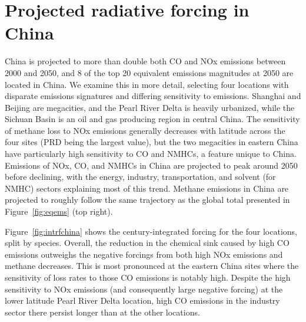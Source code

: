 \section{Projected radiative forcing in China}

China is projected to more than double both CO and NOx emissions between 2000 and 2050, and 8 of the top 20 equivalent emissions magnitudes at 2050 are located in China. We examine this in more detail, selecting four locations with disparate emissions signatures and differing sensitivity to emissions. Shanghai and Beijing are megacities, and the Pearl River Delta is heavily urbanized, while the Sichuan Basin is an oil and gas producing region in central China. The sensitivity of methane loss to NOx emissions generally decreases with latitude across the four sites (PRD being the largest value), but the two megacities in eastern China have particularly high sensitivity to CO and NMHCs, a feature unique to China. Emissions of NOx, CO, and NMHCs in China are projected to peak around 2050 before declining, with the energy, industry, transportation, and solvent (for NMHC) sectors explaining most of this trend. Methane emissions in China are projected to roughly follow the same trajectory as the global total presented in Figure~\ref{fig:eqems} (top right).

Figure~\ref{fig:intrfchina} shows the century-integrated forcing for the four locations, split by species. Overall, the reduction in the chemical sink caused by high CO emissions outweighs the negative forcings from both high NOx emissions and methane decreases. This is most pronounced at the eastern China sites where the sensitivity of loss rates to those CO emissions is notably high. Despite the high sensitivity to NOx emissions (and consequently large negative forcing) at the lower latitude Pearl River Delta location, high CO emissions in the industry sector there persist longer than at the other locations.